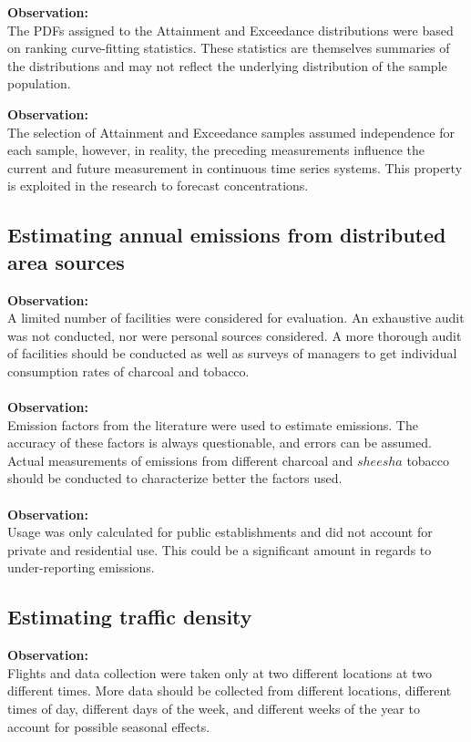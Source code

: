 \noindent
\textbf{Observation:}\\
The PDFs assigned to the Attainment and Exceedance distributions were based on ranking curve-fitting statistics. These statistics are themselves summaries of the distributions and may not reflect the underlying distribution of the sample population.

\noindent
\textbf{Observation:}\\
The selection of Attainment and Exceedance samples assumed independence for each sample, however, in reality, the preceding measurements influence the current and future measurement in continuous time series systems. This property is exploited in the research to forecast concentrations.

\subsection*{Estimating annual emissions from distributed area sources}
\noindent
\textbf{Observation:}\\
A limited number of facilities were considered for evaluation. An exhaustive audit was not conducted, nor were personal sources considered. A more thorough audit of facilities should be conducted as well as surveys of managers to get individual consumption rates of charcoal and tobacco. \\

\noindent\\
\textbf{Observation:}\\
Emission factors from the literature were used to estimate emissions. The accuracy of these factors is always questionable, and errors can be assumed. Actual measurements of emissions from different charcoal and $sheesha$ tobacco should be conducted to characterize better the factors used.\\

\noindent\\
\textbf{Observation:}\\
Usage was only calculated for public establishments and did not account for private and residential use. This could be a significant amount in regards to under-reporting emissions.\\

\subsection*{Estimating traffic density}
\noindent
\textbf{Observation:}\\
Flights and data collection were taken only at two different locations at two different times. More data should be collected from different locations, different times of day,  different days of the week, and different weeks of the year to account for possible seasonal effects. \\

